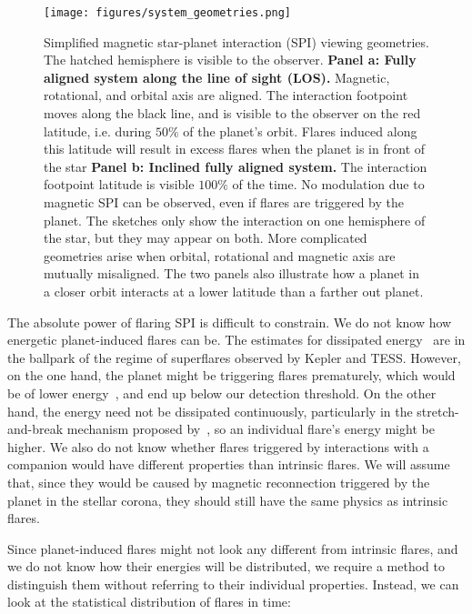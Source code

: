 \documentclass[twocolumn]{aastex631}
\begin{document}
\begin{figure*}[ht!]
    \begin{centering}
        \texttt{[image: figures/system\_geometries.png]}
        \caption{
         Simplified magnetic star-planet interaction (SPI) viewing geometries. The hatched hemisphere is visible to the observer. \textbf{ Panel a: Fully aligned system along the line of sight (LOS). } Magnetic, rotational, and orbital axis are aligned. The interaction footpoint moves along the black line, and is visible to the observer on the red latitude, i.e. during $50\%$ of the planet's orbit. Flares induced along this latitude will result in excess flares when the planet is in front of the star \textbf{Panel b: Inclined fully aligned system.} The interaction footpoint latitude is visible $100\%$ of the time. No modulation due to magnetic SPI can be observed, even if flares are triggered by the planet. The sketches only show the interaction on one hemisphere of the star, but they may appear on both. More complicated geometries arise when orbital, rotational and magnetic axis are mutually misaligned. The two panels also illustrate how a planet in a closer orbit interacts at a lower latitude than a farther out planet. }
        \label{fig:sketch}
    \end{centering}
\end{figure*}


The absolute power of flaring SPI is difficult to constrain. We do not know how energetic planet-induced flares can be. The estimates for dissipated energy~\citep{lanza2018closeby} are in the ballpark of the regime of superflares observed by Kepler and TESS. However, on the one hand, the planet might be triggering flares prematurely, which would be of lower energy~\citep{loyd2023flares}, and end up below our detection threshold. On the other hand, the energy need not be dissipated continuously, particularly in the stretch-and-break mechanism proposed by~\citep{lanza2012starplanet}, so an individual flare's energy might be higher. We also do not know whether flares triggered by interactions with a companion would have different properties than intrinsic flares. We will assume that, since they would be caused by magnetic reconnection triggered by the planet in the stellar corona, they should still have the same physics as intrinsic flares. 

Since planet-induced flares might not look any different from intrinsic flares, and we do not know how their energies will be distributed, we require a method to distinguish them without referring to their individual properties. Instead, we can look at the statistical distribution of flares in time: 
\end{document}
